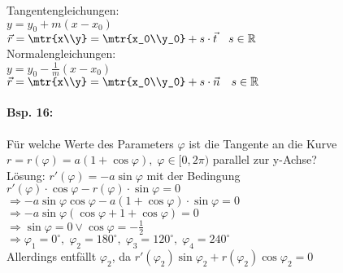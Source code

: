 Tangentengleichungen:\\
$y=y_0+m(x-x_0)$\\
$\vec{r}=\mtr{x\\y}=\mtr{x_0\\y_0}+s \cdot \vec{t} \quad s\in \mathbb{R}$\\
Normalengleichungen:\\
$y=y_0-\frac{1}{m}(x-x_0)$\\
$\vec{r}=\mtr{x\\y}=\mtr{x_0\\y_0}+s\cdot \vec{n} \quad s \in \mathbb{R}$

\paragraph{Bsp. 16:} Für welche Werte des Parameters $\varphi$ ist die Tangente an die Kurve $r=r(\varphi)=a(1+\cos \varphi), \; \varphi \in [0,2\pi)$ parallel zur y-Achse?\\
Lösung: $r'(\varphi)=-a\sin \varphi$ mit der Bedingung $r'(\varphi)\cdot \cos \varphi - r(\varphi)\cdot \sin \varphi = 0$\\
$\Rightarrow -a \sin \varphi \cos \varphi - a(1+\cos \varphi)\cdot \sin \varphi = 0$\\
$\Rightarrow -a \sin \varphi(\cos \varphi + 1 + \cos \varphi) = 0$\\
$\Rightarrow \sin \varphi = 0 \vee \cos \varphi = -\frac{1}{2}$\\
$\Rightarrow \varphi_1=0^\circ, \; \varphi_2=180^\circ, \; \varphi_3 = 120^\circ, \; \varphi_4 = 240^\circ $\\
Allerdings entfällt $\varphi_2$, da $r'(\varphi_2)\sin\varphi_2+r(\varphi_2)\cos\varphi_2 = 0$


